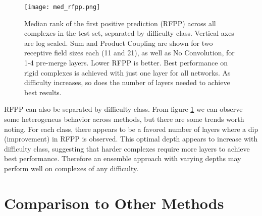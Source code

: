 \begin{figure}
	\texttt{[image: med\_rfpp.png]}
	\caption{Median rank of the first positive prediction (RFPP) across all complexes in the test set, separated by difficulty class. Vertical axes are log scaled. Sum and Product Coupling are shown for two receptive field sizes each (11 and 21), as well as No Convolution, for 1-4 pre-merge layers. Lower RFPP is better. Best performance on rigid complexes is achieved with just one layer for all networks. As difficulty increases, so does the number of layers needed to achieve best results.
		\label{fig:med_rfpp}}
\end{figure}

RFPP can also be separated by difficulty class.
From figure \ref{fig:med_rfpp} we can observe some heterogeneus behavior across methods, but there are some trends worth noting.
For each class, there appears to be a favored number of layers where a dip (improvement) in RFPP is observed. 
This optimal depth appears to increase with difficulty class, suggesting that harder complexes require more layers to achieve best performance.
Therefore an ensemble approach with varying depths may perform well on complexes of any difficulty. 



\section{Comparison to Other Methods}


